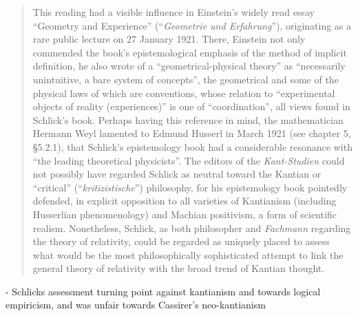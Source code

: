 \begin{quote}
    This reading had a visible influence in Einstein's widely read essay ``Geometry and Experience'' (``\emph{Geometrie und Erfahrung}''), originating as a rare public lecture on 27 January 1921.  There, Einstein not only commended the book's epistemological emphasis of the method of implicit definition, he also wrote of a ``geometrical-physical theory'' as ``necessarily unintuitive, a bare system of concepts'', the geometrical and some of the physical laws of which are conventions, whose relation to ``experimental objects of reality (experiences)'' is one of ``coordination'', all views found in Schlick's book.  Perhaps having this reference in mind, the mathematician Hermann Weyl lamented to Edmund Husserl in March 1921 (see chapter 5, \S 5.2.1), that Schlick's epistemology book had a considerable resonance with ``the leading theoretical physicists''.  The editors of the \emph{Kant-Studien} could not possibly have regarded Schlick as neutral toward the Kantian or ``critical'' (``\emph{kritizistische}'') philosophy, for his epistemology book pointedly defended, in explicit opposition to all varieties of Kantianism (including Husserlian phenomenology) and Machian positivism, a form of scientific realism.  Nonetheless, Schlick, as both philosopher and \emph{Fachmann} regarding the theory of relativity, could be regarded as uniquely placed to assess what would be the most philosophically sophisticated attempt to link the general theory of relativity with the broad trend of Kantian thought.
    
    \citep[p. 49]{Ryckman2005}
\end{quote}

- Schlicks assessment turning point against kantianism and towards logical empiricism, and was unfair towards Cassirer's neo-kantianism

